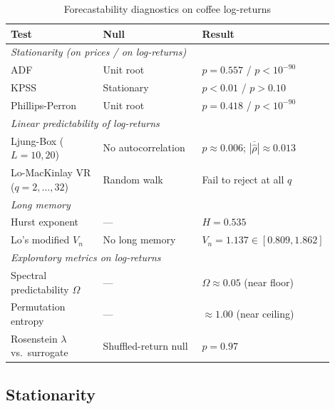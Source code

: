 \documentclass[conference]{IEEEtran}
\begin{document}
\begin{table}[t]
\caption{Forecastability diagnostics on coffee log-returns}
\label{tab:diagnostics}
\centering
\renewcommand{\arraystretch}{1.15}
\begin{tabular}{@{}p{0.30\linewidth}p{0.32\linewidth}p{0.28\linewidth}@{}}
\toprule
\textbf{Test} & \textbf{Null} & \textbf{Result} \\
\midrule
\multicolumn{3}{l}{\emph{Stationarity (on prices / on log-returns)}} \\
ADF \cite{dickey1979distribution}            & Unit root           & $p = 0.557$ / $p < 10^{-90}$ \\
KPSS \cite{kwiatkowski1992testing}           & Stationary          & $p < 0.01$ / $p > 0.10$ \\
Phillips-Perron \cite{phillips1988testing}   & Unit root           & $p = 0.418$ / $p < 10^{-90}$ \\
\midrule
\multicolumn{3}{l}{\emph{Linear predictability of log-returns}} \\
Ljung-Box ($L{=}10,20$) \cite{ljung1978measure}        & No autocorrelation  & $p \approx 0.006$; $\overline{|\hat\rho|} \approx 0.013$ \\
Lo-MacKinlay VR ($q{=}2,\dots,32$) \cite{lo1988stock}  & Random walk         & Fail to reject at all $q$ \\
\midrule
\multicolumn{3}{l}{\emph{Long memory}} \\
Hurst exponent \cite{hurst1951long}          & ---                 & $H = 0.535$ \\
Lo's modified $V_n$ \cite{lo1991long}        & No long memory      & $V_n = 1.137 \in [0.809, 1.862]$ \\
\midrule
\multicolumn{3}{l}{\emph{Exploratory metrics on log-returns}} \\
Spectral predictability $\Omega$ \cite{wang2025spectral}      & ---  & $\Omega \approx 0.05$ (near floor) \\
Permutation entropy \cite{bandt2002permutation}               & ---  & $\approx 1.00$ (near ceiling) \\
Rosenstein $\lambda$ vs.\ surrogate \cite{rosenstein1993practical,theiler1992testing}  & Shuffled-return null & $p = 0.97$ \\
\bottomrule
\end{tabular}
\end{table}

\subsection{Stationarity}
\label{sec:stationarity}
\end{document}

